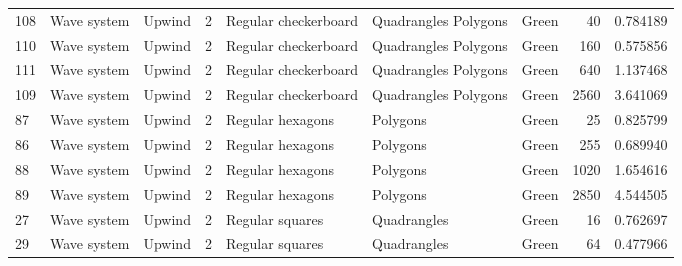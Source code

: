 \begin{tabular}{lllrlllrr}
108 &       Wave system &                         Upwind &               2 &            Regular checkerboard &   Quadrangles Polygons  &                                Green &                       40 &                         0.784189 \\
110 &       Wave system &                         Upwind &               2 &            Regular checkerboard &   Quadrangles Polygons  &                                Green &                      160 &                         0.575856 \\
111 &       Wave system &                         Upwind &               2 &            Regular checkerboard &   Quadrangles Polygons  &                                Green &                      640 &                         1.137468 \\
109 &       Wave system &                         Upwind &               2 &            Regular checkerboard &   Quadrangles Polygons  &                                Green &                     2560 &                         3.641069 \\
87  &       Wave system &                         Upwind &               2 &                Regular hexagons &               Polygons  &                                Green &                       25 &                         0.825799 \\
86  &       Wave system &                         Upwind &               2 &                Regular hexagons &               Polygons  &                                Green &                      255 &                         0.689940 \\
88  &       Wave system &                         Upwind &               2 &                Regular hexagons &               Polygons  &                                Green &                     1020 &                         1.654616 \\
89  &       Wave system &                         Upwind &               2 &                Regular hexagons &               Polygons  &                                Green &                     2850 &                         4.544505 \\
27  &       Wave system &                         Upwind &               2 &                 Regular squares &            Quadrangles  &                                Green &                       16 &                         0.762697 \\
29  &       Wave system &                         Upwind &               2 &                 Regular squares &            Quadrangles  &                                Green &                       64 &                         0.477966 \\

\end{tabular}
